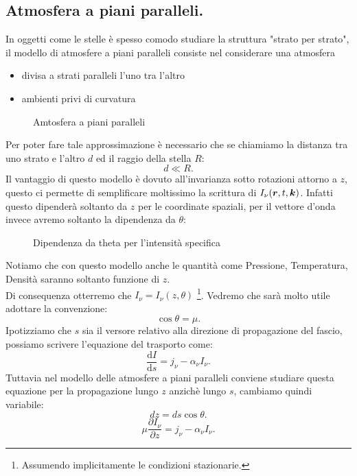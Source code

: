 \subsection{Atmosfera a piani paralleli.}%
In oggetti come le stelle è spesso comodo studiare la struttura "strato per strato", il modello di atmosfere a piani paralleli consiste nel considerare una atmosfera
\begin{itemize}
	\item divisa a strati paralleli l'uno tra l'altro
	\item ambienti privi di curvatura
\end{itemize}
\begin{figure}[H]
    \centering
    \caption{\scriptsize Amtosfera a piani paralleli}
    \label{fig:amtosfera-a-piani-paralleli}
\end{figure}
\noindent
Per poter fare tale approssimazione è necessario che se chiamiamo la distanza tra uno strato e l'altro $d$ ed il raggio della stella $R$:
\[
	d\ll R
.\] 
Il vantaggio di questo modello è dovuto all'invarianza sotto rotazioni attorno a $z$, questo ci permette di semplificare moltissimo la scrittura di $I_{\nu}( \boldsymbol{r}, t, \boldsymbol{k}) $. Infatti questo dipenderà soltanto da $z$ per le coordinate spaziali, per il vettore d'onda invece avremo soltanto la dipendenza da $\theta$:
\begin{figure}[H]
    \centering
    \caption{\scriptsize Dipendenza da theta per l'intensità specifica}
\end{figure}
\noindent 
Notiamo che con questo modello anche le quantità come Pressione, Temperatura, Densità saranno soltanto funzione di $z$.\\
Di consequenza otterremo che $I_{\nu} = I_{\nu} ( z, \theta )$ \footnote{Assumendo implicitamente le condizioni stazionarie.}. Vedremo che sarà molto utile adottare la convenzione:
\[
	\cos\theta = \mu  
.\] 
Ipotizziamo che $s$ sia il versore relativo alla direzione di propagazione del fascio, possiamo scrivere l'equazione del trasporto come:
\[
	\frac{\mbox{d} I}{\mbox{d} s} = j_{\nu} - \alpha _{\nu} I_{\nu} 
.\] 
Tuttavia nel modello delle atmosfere a piani paralleli conviene studiare questa equazione per la propagazione lungo $z$ anzichè lungo $s$, cambiamo quindi variabile:
\[
	dz = ds\cos\theta 
.\] 
\[
	\mu \frac{\partial I_{\nu} }{\partial z} = j _{\nu} -\alpha _{\nu} I_{\nu} 
.\] 
